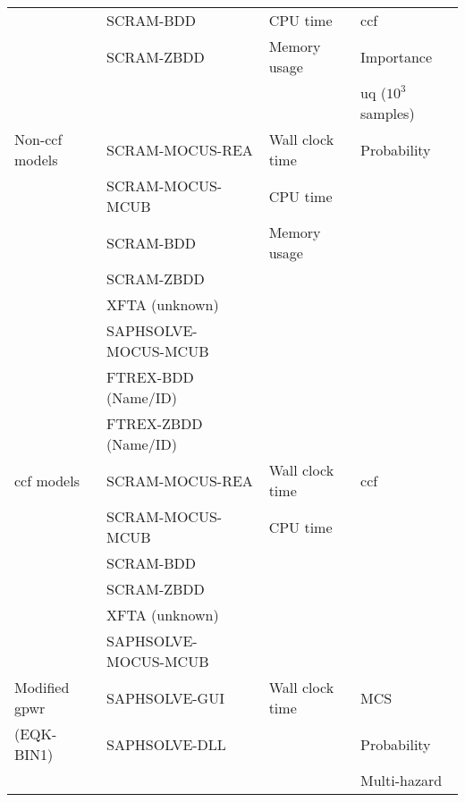 \begin{longtable}{llll}
    & SCRAM-BDD & CPU time &  \acrshort{ccf} \\
    & SCRAM-ZBDD & Memory usage &  Importance \\
    & & & \acrshort{uq} ($10^{3}$ samples) \\
\midrule
Non-\acrshort{ccf} models  & SCRAM-MOCUS-REA & Wall clock time & Probability \\
                & SCRAM-MOCUS-MCUB & CPU time & \\
                & SCRAM-BDD & Memory usage & \\
                & SCRAM-ZBDD & & \\
                & XFTA (unknown) &  &  \\
                & SAPHSOLVE-MOCUS-MCUB &  &  \\
                & FTREX-BDD (Name/ID) &  &  \\
                & FTREX-ZBDD (Name/ID) &  & \\
\midrule
\acrshort{ccf} models  & SCRAM-MOCUS-REA & Wall clock time & \acrshort{ccf} \\
            & SCRAM-MOCUS-MCUB & CPU time & \\
            & SCRAM-BDD & & \\
            & SCRAM-ZBDD & & \\
            & XFTA (unknown) & &  \\
            & SAPHSOLVE-MOCUS-MCUB &  &  \\
\midrule
Modified \acrshort{gpwr} & SAPHSOLVE-GUI & Wall clock time & MCS \\ 
(EQK-BIN1) \cite{batikh_time-dependent_2023} & SAPHSOLVE-DLL & & Probability \\
& & & Multi-hazard \\
\bottomrule
\end{longtable}